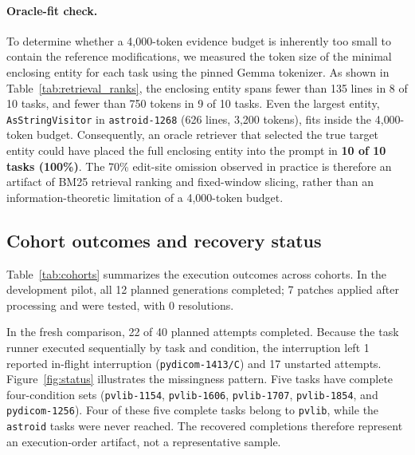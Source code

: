 \documentclass[11pt]{article}
\begin{document}
\paragraph{Oracle-fit check.}
To determine whether a 4{,}000-token evidence budget is inherently too small
to contain the reference modifications, we measured the token size of the
minimal enclosing entity for each task using the pinned Gemma tokenizer.  As
shown in Table~\ref{tab:retrieval_ranks}, the enclosing entity spans fewer
than 135 lines in 8 of 10 tasks, and fewer than 750 tokens in 9 of 10 tasks.
Even the largest entity, \nolinkurl{AsStringVisitor} in \texttt{astroid-1268}
(626 lines, 3{,}200 tokens), fits inside the 4{,}000-token budget.
Consequently, an oracle retriever that selected the true target entity could
have placed the full enclosing entity into the prompt in \textbf{10 of 10 tasks
(100\%)}.  The 70\% edit-site omission observed in practice is therefore an
artifact of BM25 retrieval ranking and fixed-window slicing, rather than an
information-theoretic limitation of a 4{,}000-token budget.

\subsection{Cohort outcomes and recovery status}

Table~\ref{tab:cohorts} summarizes the execution outcomes across cohorts.
In the development pilot, all 12 planned generations completed; 7 patches
applied after processing and were tested, with 0 resolutions.

In the fresh comparison, 22 of 40 planned attempts completed.  Because
the task runner executed sequentially by task and condition, the interruption
left 1 reported in-flight interruption (\texttt{pydicom-1413/C}) and 17
unstarted attempts.  Figure~\ref{fig:status} illustrates the missingness
pattern.  Five tasks have complete four-condition sets (\texttt{pvlib-1154},
\texttt{pvlib-1606}, \texttt{pvlib-1707}, \texttt{pvlib-1854}, and
\texttt{pydicom-1256}).  Four of these five complete tasks belong to
\texttt{pvlib}, while the \texttt{astroid} tasks were never reached.  The
recovered completions therefore represent an execution-order artifact,
not a representative sample.

\begin{table}[tb]
\centering
\caption{Cohort outcomes with explicit denominators.  Applicability denotes
recount-assisted application.  The fresh cohort reports zero demonstrated
resolutions among tested patches.  The instrumented case is excluded.}
\label{tab:cohorts}
\small
\end{table}
\end{document}
